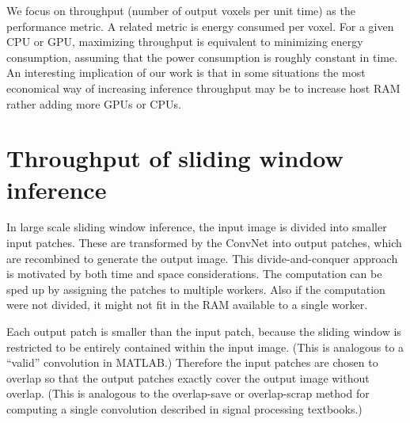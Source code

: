 \documentclass[conference]{./IEEEtran/IEEEtran}
\begin{document}
  We focus on throughput (number of output voxels per unit time) as
  the performance metric.  A related metric is energy consumed per
  voxel.  For a given CPU or GPU, maximizing throughput is equivalent
  to minimizing energy consumption, assuming that the power
  consumption is roughly constant in time.  An interesting implication
  of our work is that in some situations the most economical way of
  increasing inference throughput may be to increase host RAM rather
  adding more GPUs or CPUs.



\section{Throughput of sliding window inference}

  In large scale sliding window inference, the input image is divided
  into smaller input patches. These are transformed by the ConvNet
  into output patches, which are recombined to generate the output
  image.  This divide-and-conquer approach is motivated by both time
  and space considerations.  The computation can be sped up by
  assigning the patches to multiple workers.  Also if the computation
  were not divided, it might not fit in the RAM available to a single
  worker.

  Each output patch is smaller than the input patch, because the
  sliding window is restricted to be entirely contained within the
  input image.  (This is analogous to a ``valid'' convolution in
  MATLAB.)  Therefore the input patches are chosen to overlap so that
  the output patches exactly cover the output image without
  overlap. (This is analogous to the overlap-save or overlap-scrap
  method for computing a single convolution described in signal
  processing textbooks.)
\end{document}
